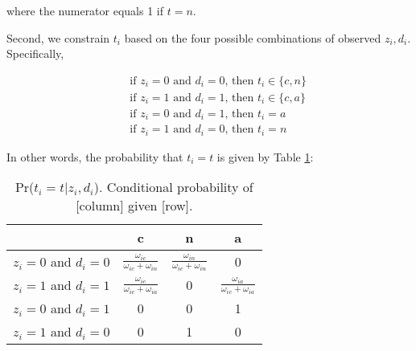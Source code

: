 \documentclass[12pt]{article}
\begin{document}
where the numerator equals 1 if $t=n$.

Second, we constrain $t_i$ based on the four possible combinations of
observed $z_i,d_i$.  Specifically,

\begin{eqnarray*}
&& \textrm{if $z_i=0$ and $d_i=0$, then $t_i \in \{c,n\}$}  \\
&& \textrm{if $z_i=1$ and $d_i=1$, then $t_i \in \{c,a\}$}  \\
&& \textrm{if $z_i=0$ and $d_i=1$, then $t_i = a$} \\
&& \textrm{if $z_i=1$ and $d_i=0$, then $t_i = n$} 
\end{eqnarray*}

In other words, the probability that $t_i=t$ is given by Table
\ref{pr.t}:

\begin{table}[h!]
\begin{center}
\begin{tabular}{lccc}
			& c & n & a \\ \hline
$z_i=0$ and $d_i=0$ &  $\frac{\omega_{ic}}{\omega_{ic} +
\omega_{in}}$ & $\frac{\omega_{in}}{\omega_{ic} +\omega_{in}}$ &  0 \\
$z_i=1$ and $d_i=1$ &  $\frac{\omega_{ic}}{\omega_{ic} +
\omega_{ia}}$ & 0 & $\frac{\omega_{ia}}{\omega_{ic} +\omega_{ia}}$ \\
$z_i=0$ and $d_i=1$ &  0 & 0 & 1 \\
$z_i=1$ and $d_i=0$ &  0 & 1 & 0 \\ \hline
\end{tabular}
\end{center}
\caption{Pr($t_i=t|z_i,d_i$).  Conditional probability of [column]
given [row].}
\label{pr.t}
\end{table}

\end{document}
